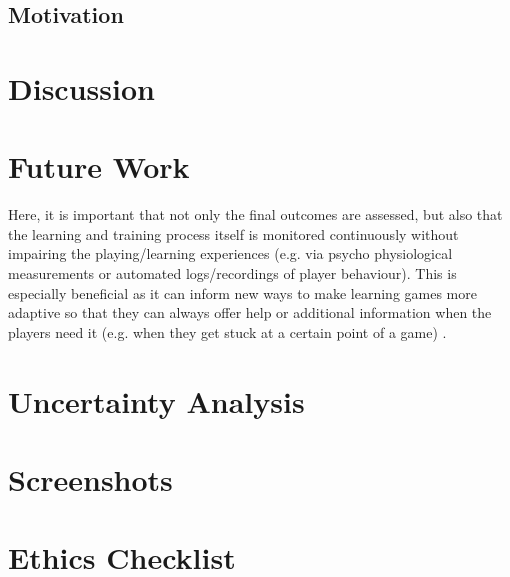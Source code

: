 \documentclass[a4paper,11.5pt]{report}
\numberwithin{figure}{section}
\numberwithin{table}{section}
\numberwithin{equation}{section}
\numberwithin{equation}{section}
\newcommand\blankpage{%
    \null
    \thispagestyle{empty}%
    \addtocounter{page}{-1}%
    \newpage}
\begin{document}
\section{Motivation}




\afterpage{\blankpage}



\chapter{Discussion}
\afterpage{\blankpage}



\chapter{Future Work}

Here, it is important that not only the final outcomes are assessed, but also that the learning and training process itself is monitored continuously without impairing the playing/learning experiences (e.g. via psycho physiological measurements or automated logs/recordings of player behaviour). This is especially beneficial as it can inform new ways to make learning games more adaptive so that they can always offer help or additional information when the players need it (e.g. when they get stuck at a certain point of a game) \citep{Breuer2010}.

\afterpage{\blankpage}





\appendix
{}
\appendixpage

\renewcommand\chaptername{Appendix}

\newpage
\chapter{Uncertainty Analysis} \label{app:errors}

\chapter{Screenshots} \label{app:screenshots}

\chapter{Ethics Checklist} \label{app:ethicschecklist}
\end{document}
